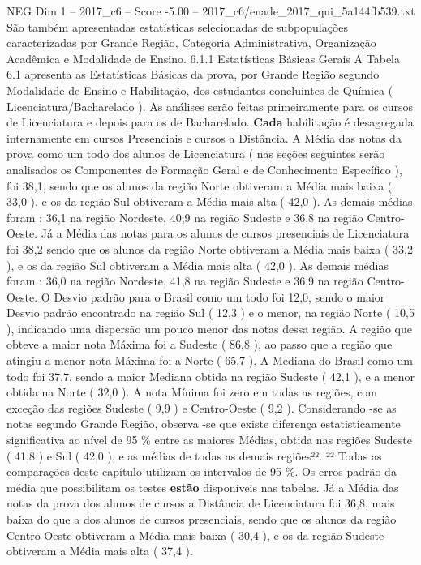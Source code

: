 \begin{textsample}{NEG Dim 1 – 2017\_c6 – Score -5.00 – 2017\_c6/enade\_2017\_qui\_5a144fb539.txt}
São também apresentadas estatísticas selecionadas de subpopulações caracterizadas por Grande Região, Categoria Administrativa, Organização Acadêmica e Modalidade de Ensino. 6.1.1 Estatísticas Básicas Gerais A Tabela 6.1 apresenta as Estatísticas Básicas da prova, por Grande Região segundo Modalidade de Ensino e Habilitação, dos estudantes concluintes de Química ( Licenciatura/Bacharelado ).
As análises serão feitas primeiramente para os cursos de Licenciatura e depois para os de Bacharelado. \textbf{Cada} habilitação é desagregada internamente em cursos Presenciais e cursos a Distância.
A Média das notas da prova como um todo dos alunos de Licenciatura ( nas seções seguintes serão analisados os Componentes de Formação Geral e de Conhecimento Específico ), foi 38,1, sendo que os alunos da região Norte obtiveram a Média mais baixa ( 33,0 ), e os da região Sul obtiveram a Média mais alta ( 42,0 ).
As demais médias foram : 36,1 na região Nordeste, 40,9 na região Sudeste e 36,8 na região Centro-Oeste.
Já a Média das notas para os alunos de cursos presenciais de Licenciatura foi 38,2 sendo que os alunos da região Norte obtiveram a Média mais baixa ( 33,2 ), e os da região Sul obtiveram a Média mais alta ( 42,0 ).
As demais médias foram : 36,0 na região Nordeste, 41,8 na região Sudeste e 36,9 na região Centro-Oeste.
O Desvio padrão para o Brasil como um todo foi 12,0, sendo o maior Desvio padrão encontrado na região Sul ( 12,3 ) e o menor, na região Norte ( 10,5 ), indicando uma dispersão um pouco menor das notas dessa região.
A região que obteve a maior nota Máxima foi a Sudeste ( 86,8 ), ao passo que a região que atingiu a menor nota Máxima foi a Norte ( 65,7 ).
A Mediana do Brasil como um todo foi 37,7, sendo a maior Mediana obtida na região Sudeste ( 42,1 ), e a menor obtida na Norte ( 32,0 ).
A nota Mínima foi zero em todas as regiões, com exceção das regiões Sudeste ( 9,9 ) e Centro-Oeste ( 9,2 ).
Considerando -se as notas segundo Grande Região, observa -se que existe diferença estatisticamente significativa ao nível de 95 \% entre as maiores Médias, obtida nas regiões Sudeste ( 41,8 ) e Sul ( 42,0 ), e as médias de todas as demais regiões²². ²² Todas as comparações deste capítulo utilizam os intervalos de 95 \%.
Os erros-padrão da média que possibilitam os testes \textbf{estão} disponíveis nas tabelas.
Já a Média das notas da prova dos alunos de cursos a Distância de Licenciatura foi 36,8, mais baixa do que a dos alunos de cursos presenciais, sendo que os alunos da região Centro-Oeste obtiveram a Média mais baixa ( 30,4 ), e os da região Sudeste obtiveram a Média mais alta ( 37,4 ).

\end{textsample}
